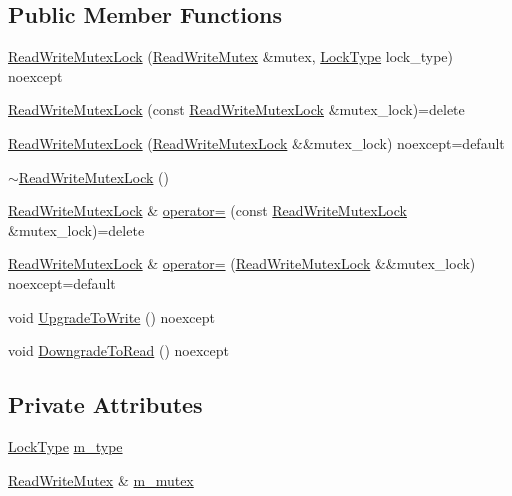 \subsection*{Public Member Functions}
\begin{DoxyCompactItemize}
\item 
\hyperlink{classmage_1_1_read_write_mutex_lock_aadf5c0f0dd82c478d840bb7801060031}{Read\+Write\+Mutex\+Lock} (\hyperlink{classmage_1_1_read_write_mutex}{Read\+Write\+Mutex} \&mutex, \hyperlink{classmage_1_1_read_write_mutex_lock_a5fee0529edf58803ee1f5d4afa084a3b}{Lock\+Type} lock\+\_\+type) noexcept
\item 
\hyperlink{classmage_1_1_read_write_mutex_lock_a2c9cd6329bfd18c4752235ebee7edb4a}{Read\+Write\+Mutex\+Lock} (const \hyperlink{classmage_1_1_read_write_mutex_lock}{Read\+Write\+Mutex\+Lock} \&mutex\+\_\+lock)=delete
\item 
\hyperlink{classmage_1_1_read_write_mutex_lock_ac1c42cf89476d5e48e35d8b3fb05dc70}{Read\+Write\+Mutex\+Lock} (\hyperlink{classmage_1_1_read_write_mutex_lock}{Read\+Write\+Mutex\+Lock} \&\&mutex\+\_\+lock) noexcept=default
\item 
\hyperlink{classmage_1_1_read_write_mutex_lock_a64b600234d29ba7307fcd77a17486582}{$\sim$\+Read\+Write\+Mutex\+Lock} ()
\item 
\hyperlink{classmage_1_1_read_write_mutex_lock}{Read\+Write\+Mutex\+Lock} \& \hyperlink{classmage_1_1_read_write_mutex_lock_ade82a57f337e39a1515f67fbc1f6fc43}{operator=} (const \hyperlink{classmage_1_1_read_write_mutex_lock}{Read\+Write\+Mutex\+Lock} \&mutex\+\_\+lock)=delete
\item 
\hyperlink{classmage_1_1_read_write_mutex_lock}{Read\+Write\+Mutex\+Lock} \& \hyperlink{classmage_1_1_read_write_mutex_lock_aa9cd2de6983f8251d7494205bddce168}{operator=} (\hyperlink{classmage_1_1_read_write_mutex_lock}{Read\+Write\+Mutex\+Lock} \&\&mutex\+\_\+lock) noexcept=default
\item 
void \hyperlink{classmage_1_1_read_write_mutex_lock_a25629916d6a73e930763c34aaa13c647}{Upgrade\+To\+Write} () noexcept
\item 
void \hyperlink{classmage_1_1_read_write_mutex_lock_a1300da588c4a0950cca5a3b6a65d5f29}{Downgrade\+To\+Read} () noexcept
\end{DoxyCompactItemize}
\subsection*{Private Attributes}
\begin{DoxyCompactItemize}
\item 
\hyperlink{classmage_1_1_read_write_mutex_lock_a5fee0529edf58803ee1f5d4afa084a3b}{Lock\+Type} \hyperlink{classmage_1_1_read_write_mutex_lock_a754d235c4ba2f8f8da51342ad497a735}{m\+\_\+type}
\item 
\hyperlink{classmage_1_1_read_write_mutex}{Read\+Write\+Mutex} \& \hyperlink{classmage_1_1_read_write_mutex_lock_a6ee9034fa984e11ec07c20ec77ab1bfe}{m\+\_\+mutex}
\end{DoxyCompactItemize}


